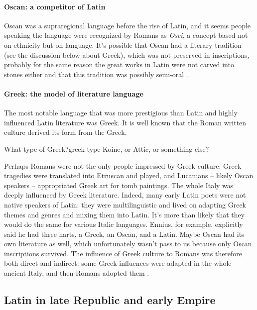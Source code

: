 \documentclass[a4paper, oneside, 12pt]{report}
\newcommand*{\citepage}[1]{p.~{#1}}
\newcommand*{\citepages}[1]{pp.~{#1}}
\newcommand{\form}[1]{\emph{#1}}
\begin{document}
\paragraph*{Oscan: a competitor of Latin}
Oscan was a supraregional language before the rise of Latin,
and it seems people speaking the language were recognized by Romans as \form{Osci},
a concept based not on ethnicity but on language.
It's possible that Oscan had a literary tradition (see the discussion below about Greek),
which was not preserved in inscriptions,
probably for the same reason the great works in Latin were not carved into stones either
and that this tradition was possibly semi-oral \citep[\citepage{51}]{leonhardt2013latin}.

\paragraph*{Greek: the model of literature language}
The most notable language that was more prestigious than Latin and highly influenced Latin literature was Greek.
It is well known that the Roman written culture derived its form from the Greek.

\begin{todobox}{What type of Greek?}{greek-type}
    Koine, or Attic, or something else?
\end{todobox}

Perhaps Romans were not the only people impressed by Greek culture:
Greek tragedies were translated into Etruscan and played,
and Lucanians -- likely Oscan speakers -- appropriated Greek art for tomb paintings.
The whole Italy was deeply influenced by Greek literature.
Indeed, many early Latin poets were not native speakers of Latin: 
they were multilinguistic and lived on adapting Greek themes and genres and mixing them into Latin.
It's more than likely that they would do the same for various Italic languages.
Ennius, for example, explicitly said he had three harts, a Greek, an Oscan, and a Latin.
Maybe Oscan had its own literature as well,
which unfortunately wasn't pass to us because only Oscan inscriptions survived.
The influence of Greek culture to Romans was therefore both direct and indirect:
some Greek influences were adapted in the whole ancient Italy,
and then Romans adopted them
\citep[\citepages{49-50}]{leonhardt2013latin}.



\subsection{Latin in late Republic and early Empire}
\end{document}
